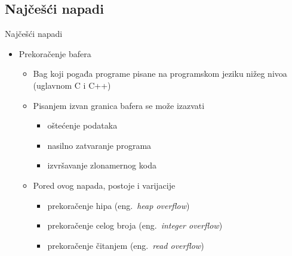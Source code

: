 \documentclass{beamer}
\begin{document}
\subsection{Najčešći napadi}

\begin{frame}{Najčešći napadi}
    \begin{itemize}
      \item Prekoračenje bafera
        \begin{itemize}
            \item Bag koji pogađa programe pisane na programskom jeziku nižeg nivoa (uglavnom C i C++) \pause
            \item Pisanjem izvan granica bafera se može izazvati
            \begin{itemize}
                \item oštećenje podataka \pause
                \item nasilno zatvaranje programa \pause
                \item izvršavanje zlonamernog koda \pause
            \end{itemize}
            \item Pored ovog napada, postoje i varijacije
            \begin{itemize}
                \item prekoračenje hipa (eng.~{\em heap overflow})
                \item prekoračenje celog broja (eng.~{\em integer overflow})
                \item prekoračenje čitanjem (eng.~{\em read overflow})
            \end{itemize}
        \end{itemize}
    \end{itemize}
\end{frame}
\end{document}
